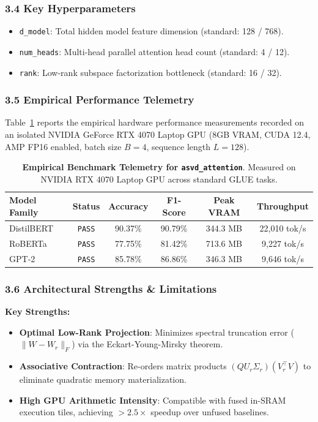 \subsubsection*{3.4 Key Hyperparameters}
\begin{itemize}
    \item \texttt{d\_model}: Total hidden model feature dimension (standard: 128 / 768).
    \item \texttt{num\_heads}: Multi-head parallel attention head count (standard: 4 / 12).
    \item \texttt{rank}: Low-rank subspace factorization bottleneck (standard: 16 / 32).
\end{itemize}

\subsubsection*{3.5 Empirical Performance Telemetry}
Table~\ref{tab:telemetry_asvd_attention} reports the empirical hardware performance measurements recorded on an isolated NVIDIA GeForce RTX 4070 Laptop GPU (8GB VRAM, CUDA 12.4, AMP FP16 enabled, batch size $B=4$, sequence length $L=128$).

\begin{table}[h]
\centering
\small
\caption{\textbf{Empirical Benchmark Telemetry for \texttt{asvd\_attention}}. Measured on NVIDIA RTX 4070 Laptop GPU across standard GLUE tasks.}
\label{tab:telemetry_asvd_attention}
\begin{tabular*}{\columnwidth}{@{\extracolsep{\fill}}lccccc}
\toprule
\textbf{Model Family} & \textbf{Status} & \textbf{Accuracy} & \textbf{F1-Score} & \textbf{Peak VRAM} & \textbf{Throughput} \\
\midrule
DistilBERT & \texttt{PASS} & 90.37\% & 90.79\% & 344.3 MB & 22,010 tok/s \\
RoBERTa & \texttt{PASS} & 77.75\% & 81.42\% & 713.6 MB & 9,227 tok/s \\
GPT-2 & \texttt{PASS} & 85.78\% & 86.86\% & 346.3 MB & 9,646 tok/s \\
\bottomrule
\end{tabular*}
\end{table}

\subsubsection*{3.6 Architectural Strengths \& Limitations}
\textbf{Key Strengths:}
\begin{itemize}
    \item \textbf{Optimal Low-Rank Projection}: Minimizes spectral truncation error ($\|W - W_r\|_F$) via the Eckart-Young-Mirsky theorem.
    \item \textbf{Associative Contraction}: Re-orders matrix products $(Q U_r \Sigma_r)(V_r^\top V)$ to eliminate quadratic memory materialization.
    \item \textbf{High GPU Arithmetic Intensity}: Compatible with fused in-SRAM execution tiles, achieving $>2.5\times$ speedup over unfused baselines.
\end{itemize}

